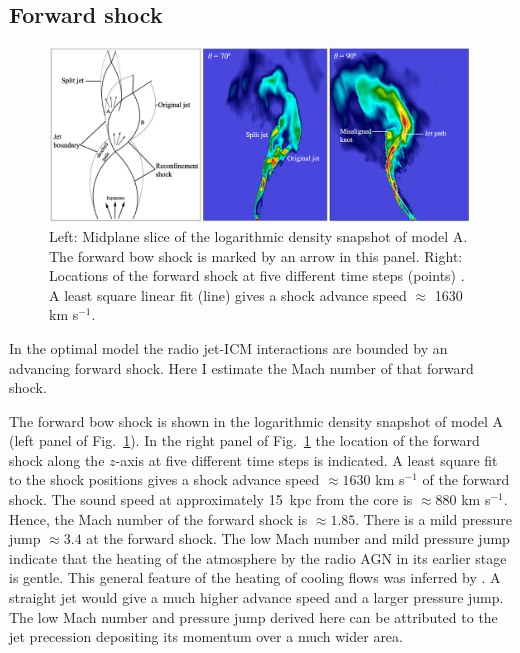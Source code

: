 %
%
\subsection{Forward shock} 
\begin{figure}
\centering
\includegraphics[width=\textwidth]{fig7.eps}
\caption{ Left: Midplane slice of the logarithmic density snapshot of model A. The forward bow shock is marked by an arrow in this panel. Right: Locations of the forward shock at five different time steps (points) . A least square linear fit (line) gives a shock advance speed $\approx$ 1630 km s$^{-1}$. }
\label{f:fsh}
\end{figure}

In the optimal model the radio jet-ICM interactions are bounded by an advancing forward shock. Here I estimate the Mach number of that forward shock. 

The forward bow shock is shown in the logarithmic density snapshot of model A (left panel of Fig.~\ref{f:fsh}). In the right panel of Fig.~\ref{f:fsh} the location of the forward shock along the $z$-axis at five different time steps is indicated. A least square fit to the shock positions gives a shock advance speed $\approx  1630$ km s$^{-1}$ of the forward shock. The sound speed at approximately 15~kpc from the core is $\approx 880$ km s$^{-1}$. Hence, the Mach number of the forward shock is $\approx 1.85$. 
There is a mild pressure jump $\approx 3.4$ at the forward shock. The low Mach number and mild pressure jump indicate that the heating of the atmosphere by the radio AGN in its earlier stage is gentle. This general feature of the heating of cooling flows was inferred by \citep{mcnamara12}. A straight jet would give a much higher advance speed and a larger pressure jump. The low Mach number and pressure jump derived here can be attributed to the jet precession depositing its momentum over a much wider area. 


